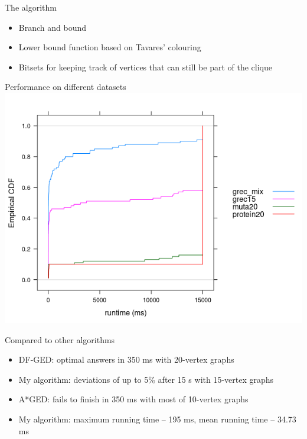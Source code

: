 \documentclass{beamer}
\begin{document}
\begin{frame}{The algorithm}
  \begin{itemize}
  \item Branch and bound
  \item Lower bound function based on Tavares' colouring \cite{DBLP:phd/hal/tavares16}
  \item Bitsets for keeping track of vertices that can still be part of the clique
  \end{itemize}
\end{frame}
\begin{frame}{Performance on different datasets}
  \includegraphics[scale=0.6]{../ecdfs.png}
\end{frame}
\begin{frame}{Compared to other algorithms \cite{DBLP:conf/icpram/Abu-AishehRRM15}}
  \begin{itemize}
  \item DF-GED: optimal answers in 350 ms with 20-vertex graphs
  \item My algorithm: deviations of up to 5\% after 15 s with 15-vertex graphs
  \end{itemize}
  \begin{itemize}
  \item A*GED: fails to finish in 350 ms with most of 10-vertex graphs
  \item My algorithm: maximum running time -- 195 ms, mean running time -- 34.73 ms
  \end{itemize}
\end{frame}
\end{document}
